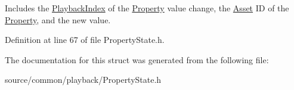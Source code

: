 Includes the \hyperlink{struct_picto_1_1_playback_index}{Playback\-Index} of the \hyperlink{class_picto_1_1_property}{Property} value change, the \hyperlink{class_picto_1_1_asset}{Asset} I\-D of the \hyperlink{class_picto_1_1_property}{Property}, and the new value. 

Definition at line 67 of file Property\-State.\-h.



The documentation for this struct was generated from the following file\-:\begin{DoxyCompactItemize}
\item 
source/common/playback/Property\-State.\-h\end{DoxyCompactItemize}
